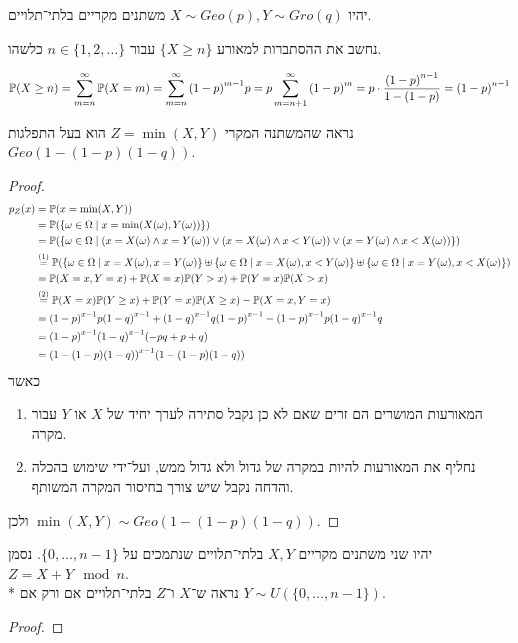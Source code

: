 \Question{}
יהיו $X \sim Geo(p), Y \sim Gro(q)$ משתנים מקריים בלתי־תלויים.

\Subquestion{}
נחשב את ההסתברות למאורע $\{X \ge n \}$ עבור $n \in \{1, 2, \dots\}$ כלשהו.
\begin{solution}
	\[
		\mathbb{P}(X \ge n)
		= \sum_{m = n}^\infty \mathbb{P}(X = m)
		= \sum_{m = n}^\infty {(1 - p)}^{m - 1} p
		= p \sum_{m = n + 1}^\infty {(1 - p)}^m
		= p \cdot \frac{{(1 - p)}^{n - 1}}{1 - (1 - p)}
		= {(1 - p)}^{n - 1}
	\]
\end{solution}

\Subquestion{}
נראה שהמשתנה המקרי $Z = \min(X, Y)$ הוא בעל התפלגות $Geo(1 - (1 - p)(1 - q))$.
\begin{proof}
	\begin{align*}
		p_Z(x)
		& = \mathbb{P}(x = \min(X, Y)) \\
		& = \mathbb{P}(\{\omega \in \Omega \mid x = \min(X(\omega), Y(\omega))\}) \\
		& = \mathbb{P}(\{\omega \in \Omega \mid (x = X(\omega) \land x = Y(\omega)) \lor (x = X(\omega) \land x < Y(\omega)) \lor (x = Y(\omega) \land x < X(\omega))\}) \\
		& \overset{(1)}{=} \mathbb{P}(\{\omega \in \Omega \mid x = X(\omega), x = Y(\omega)\} \uplus \{ \omega \in \Omega \mid x = X(\omega), x < Y(\omega)\} \uplus \{\omega \in \Omega \mid x = Y(\omega), x < X(\omega)\}) \\
		& = \mathbb{P}(X = x, Y = x) + \mathbb{P}(X = x) \mathbb{P}(Y > x) + \mathbb{P}(Y = x) \mathbb{P}(X > x) \\
		& \overset{(2)}{=} \mathbb{P}(X = x) \mathbb{P}(Y \ge x) + \mathbb{P}(Y = x) \mathbb{P}(X \ge x) - \mathbb{P}(X = x, Y = x) \\
		& = {(1 - p)}^{x - 1} p {(1 - q)}^{x - 1} + {(1 - q)}^{x - 1} q {(1 - p)}^{x - 1} - {(1 - p)}^{x - 1} p {(1 - q)}^{x - 1} q \\
		& = {(1 - p)}^{x - 1} {(1 - q)}^{x - 1} (-p q + p + q) \\
		& = {(1 - (1 - p)(1 - q))}^{x - 1} (1 - (1 - p)(1 - q)) \\
	\end{align*}
	כאשר
	\begin{enumerate}
		\item המאורעות המושרים הם זרים שאם לא כן נקבל סתירה לערך יחיד של $X$ או $Y$ עבור מקרה.
		\item נחליף את המאורעות להיות במקרה של גדול ולא גדול ממש, ועל־ידי שימוש בהכלה והדחה נקבל שיש צורך בחיסור המקרה המשותף.
	\end{enumerate}
	ולכן $\min(X, Y) \sim Geo(1 - (1 - p)(1 - q))$.
\end{proof}

\Question{}
יהיו שני משתנים מקריים $X, Y$ בלתי־תלויים שנתמכים על $\{0, \dots, n - 1\}$. נסמן $Z = X + Y \mod n$. \\*
נראה ש־$X$ ו־$Z$ בלתי־תלויים אם ורק אם $Y \sim U(\{0, \dots, n - 1\})$.
\begin{proof}
	
\end{proof}


